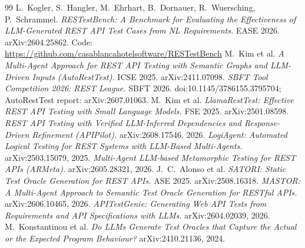 \documentclass[11pt,a4paper]{article}
\begin{document}
\begin{thebibliography}{99}\small
\setlength{\itemsep}{1pt}
 L.~Kogler, S.~Hangler, M.~Ehrhart, B.~Dornauer, R.~Wuersching, P.~Schrammel. \emph{RESTestBench: A Benchmark for Evaluating the Effectiveness of LLM-Generated REST API Test Cases from NL Requirements.} EASE 2026. arXiv:2604.25862. Code: \url{https://github.com/casablancahotelsoftware/RESTestBench}
 M.~Kim et al. \emph{A Multi-Agent Approach for REST API Testing with Semantic Graphs and LLM-Driven Inputs (AutoRestTest).} ICSE 2025. arXiv:2411.07098.
 \emph{SBFT Tool Competition 2026: REST League.} SBFT 2026. doi:10.1145/3786155.3795704; AutoRestTest report: arXiv:2607.01063.
 M.~Kim et al. \emph{LlamaRestTest: Effective REST API Testing with Small Language Models.} FSE 2025. arXiv:2501.08598.
 \emph{REST API Testing with Verified LLM-Inferred Dependencies and Response-Driven Refinement (APIPilot).} arXiv:2608.17546, 2026.
 \emph{LogiAgent: Automated Logical Testing for REST Systems with LLM-Based Multi-Agents.} arXiv:2503.15079, 2025.
 \emph{Multi-Agent LLM-based Metamorphic Testing for REST APIs (ARMeta).} arXiv:2605.28321, 2026.
 J.~C.~Alonso et al. \emph{SATORI: Static Test Oracle Generation for REST APIs.} ASE 2025. arXiv:2508.16318.
 \emph{MASTOR: A Multi-Agent Approach to Semantic Test Oracle Generation for RESTful APIs.} arXiv:2606.10465, 2026.
 \emph{APITestGenie: Generating Web API Tests from Requirements and API Specifications with LLMs.} arXiv:2604.02039, 2026.
 M.~Konstantinou et al. \emph{Do LLMs Generate Test Oracles that Capture the Actual or the Expected Program Behaviour?} arXiv:2410.21136, 2024.
\end{thebibliography}
\end{document}
